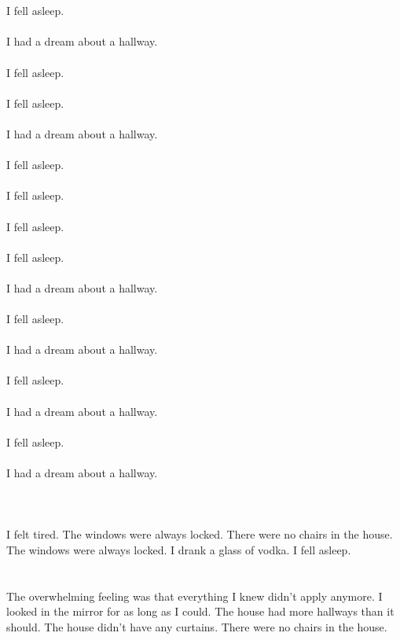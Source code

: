 \documentclass{article}
\begin{document}
    \section{}
    I fell asleep.\\\\I had a dream about a hallway.\\\\ I fell asleep.\\\\ I fell asleep.\\\\I had a dream about a hallway.\\\\ I fell asleep.\\\\ I fell asleep.\\\\ I fell asleep.\\\\ I fell asleep.\\\\I had a dream about a hallway.\\\\ I fell asleep.\\\\I had a dream about a hallway.\\\\ I fell asleep.\\\\I had a dream about a hallway.\\\\ I fell asleep.\\\\I had a dream about a hallway.\\\\ 
    \newpage
    
    \section{}
    I felt tired. The windows were always locked. There were no chairs in the house. The windows were always locked. I drank a glass of vodka. I fell asleep.  
    \newpage
    
    \section{}
    The overwhelming feeling was that everything I knew didn't apply anymore. I looked in the mirror for as long as I could. The house had more hallways than it should. The house didn't have any curtains. There were no chairs in the house.  
    \newpage
    
\end{document}
